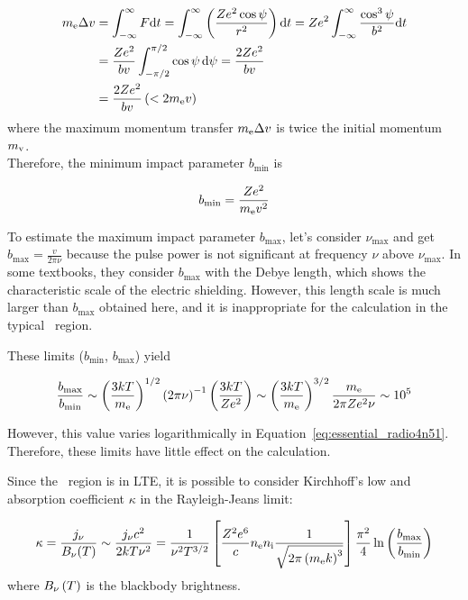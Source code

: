 \begin{align}\label{eq:essential_radio4n40}
    m_{\mathrm{e}} \Delta v &= \int_{-\infty}^{\infty} F \mathrm{d} t = \int_{-\infty}^{\infty}\left(\frac{Z e^{2} \cos \psi}{r^{2}}\right) \mathrm{d} t=Z e^{2} \int_{-\infty}^{\infty} \frac{\cos ^{3} \psi}{b^{2}} \mathrm{d} t \\
                      &= \frac{Z e^{2}}{b v} \int_{-\pi / 2}^{\pi / 2} \cos \psi\,\mathrm{d} \psi=\frac{2 Z e^{2}}{b v} \\
                      &= \frac{2Ze^2}{bv} \left(< 2m_{\mathrm{e}}v\right)
\end{align}
where the maximum momentum transfer $m_{\mathrm{e}} \Delta v$ is twice the initial momentum $m_{\mathrm{v}}$. \\

Therefore, the minimum impact parameter $b_{\min}$ is

\begin{equation}\label{eq:essential_radio4n43}
    b_{\min} = \frac{Ze^2}{m_{\mathrm{e}}v^2}
\end{equation}

To estimate the maximum impact parameter $b_{\max}$, let's consider $\nu_{\max}$ and get $b_{\max} = \frac{v}{2\pi \nu}$ because the pulse power is not significant at frequency $\nu$ above $\nu_{\max}$.
In some textbooks, they consider $b_{\max}$ with the Debye length, which shows the characteristic scale of the electric shielding.
However, this length scale is much larger than $b_{\max}$ obtained here, and it is inappropriate for the calculation in the typical \ih~region.

These limits ($b_{\min}$, $b_{\max}$) yield

\begin{equation}\label{eq:essential_radio4n49}
    \frac{b_{\max }}{b_{\min }} \sim \left(\frac{3 k T}{m_{\mathrm{e}}}\right)^{1 / 2}\left(2 \pi \nu\right)^{-1}\left(\frac{3 k T}{Z e^{2}}\right) \sim \left(\frac{3 k T}{m_{\mathrm{e}}}\right)^{3 / 2} \frac{m_{\mathrm{e}}}{2 \pi Z e^{2} \nu} \sim 10^5
\end{equation}

However, this value varies logarithmically in Equation~\ref{eq:essential_radio4n51}.
Therefore, these limits have little effect on the calculation.

Since the \ih~region is in LTE, it is possible to consider Kirchhoff's low and absorption coefficient $\kappa$ in the Rayleigh-Jeans limit:

\begin{equation}\label{eq:essential_radio4n51}
    \kappa=\frac{j_{\nu}}{B_{\nu}(T)} \sim \frac{j_{\nu} c^2}{2 k T \nu^2} = \frac{1}{\nu^2 T^{3/2}}\left[\frac{Z^2 e^6}{c} n_{\mathrm{e}} n_{\mathrm{i}} \frac{1}{\sqrt{2\pi\left(m_{\mathrm{e}} k\right)^3}}\right] \frac{\pi^2}{4} \ln \left(\frac{b_{\max}}{b_{\min}}\right)
\end{equation}
where $B_{\nu}\left(T\right)$ is the blackbody brightness.

